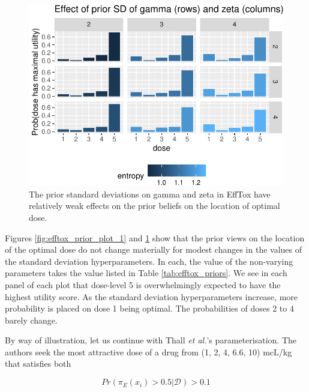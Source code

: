 \documentclass[article]{jss}
\begin{document}
\begin{CodeChunk}
\begin{figure}

{\centering \includegraphics{trialr_files/figure-latex/efftox_prior_plot_2-1} 

}

\caption[The prior standard deviations on gamma and zeta in EffTox have relatively weak effects on the prior beliefs on the location of optimal dose]{The prior standard deviations on gamma and zeta in EffTox have relatively weak effects on the prior beliefs on the location of optimal dose.}\label{fig:efftox_prior_plot_2}
\end{figure}
\end{CodeChunk}

Figures \ref{fig:efftox_prior_plot_1} and \ref{fig:efftox_prior_plot_2}
show that the prior views on the location of the optimal dose do not
change materially for modest changes in the values of the standard
deviation hyperparameters. In each, the value of the non-varying
parameters takes the value listed in Table \ref{tab:efftox_priors}. We
see in each panel of each plot that dose-level 5 is overwhelmingly
expected to have the highest utility score. As the standard deviation
hyperparameters increase, more probability is placed on dose 1 being
optimal. The probabilities of doses 2 to 4 barely change.

By way of illustration, let us continue with Thall \textit{et al.}'s
parameterisation. The authors seek the most attractive dose of a drug
from (1, 2, 4, 6.6, 10) mcL/kg that satisfies both

\begin{equation}
Pr(\pi_E(x_i) > 0.5 | \mathcal{D}) > 0.1
\end{equation}
\end{document}
